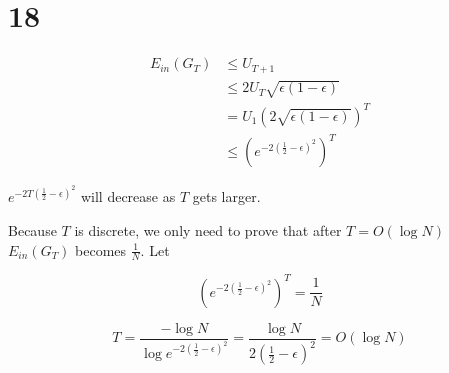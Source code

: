 \documentclass[12pt]{article}
\begin{document}
\section*{18}
\begin{equation*}
\begin{split}
    E_{in}(G_T) &\leq U_{T+1} \\
    &\leq 2 U_T \sqrt{\epsilon(1-\epsilon)} \\
    &= U_1 (2 \sqrt{\epsilon(1-\epsilon)})^T \\
    &\leq (e^{-2(\frac{1}{2}-\epsilon)^2})^T
\end{split}
\end{equation*}

$e^{-2T(\frac{1}{2}-\epsilon)^2}$ will decrease as $T$ gets larger.

Because $T$ is discrete, we only need to prove that 
after $T=O(\log N)$ $E_{in}(G_T)$ becomes $\frac{1}{N}$.
Let

$$ (e^{-2(\frac{1}{2}-\epsilon)^2})^T = \frac{1}{N}$$

$$ T = \frac{-\log N}{ \log e^{-2(\frac{1}{2}-\epsilon)^2}} = \frac{\log N}{2(\frac{1}{2}-\epsilon)^2} = O(\log N)$$
\end{document}
